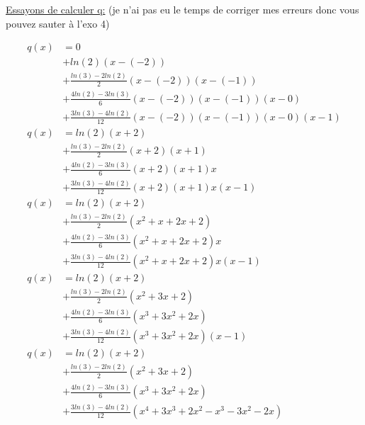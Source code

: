 \documentclass[12pt, letterpaper]{article}
\begin{document}
\begin{enumerate}
  \underline{Essayons de calculer q:} (je n'ai pas eu le temps de
  corriger mes erreurs donc vous pouvez sauter à l'exo 4)

  \begin{equation*}
    \begin{split}
      q(x) & = 0 \\
      & + ln(2) (x - (-2)) \\
      & + \frac{ln(3) - 2 ln(2)}{2} (x - (-2)) (x - (-1)) \\
      & + \frac{ 4 ln(2) - 3 ln(3)}{6} (x - (-2)) (x - (-1)) (x - 0) \\
      & + \frac{ 3 ln(3) - 4 ln(2)}{12}(x - (-2)) (x - (-1)) (x - 0) (x -
      1) \\
      q(x) & = ln(2) (x + 2) \\
      & + \frac{ln(3) - 2 ln(2)}{2} (x + 2) (x + 1) \\
      & + \frac{ 4 ln(2) - 3 ln(3)}{6} (x + 2) (x + 1) x \\
      & + \frac{ 3 ln(3) - 4 ln(2)}{12} (x + 2) (x + 1) x (x - 1) \\
      q(x) & = ln(2) (x + 2) \\
      & + \frac{ln(3) - 2 ln(2)}{2} (x^2 + x + 2x + 2) \\
      & + \frac{ 4 ln(2) - 3 ln(3)}{6} (x^2 + x + 2x + 2) x \\
      & + \frac{ 3 ln(3) - 4 ln(2)}{12} (x^2 + x + 2x + 2) x (x - 1) \\
      q(x) & = ln(2) (x + 2) \\
      & + \frac{ln(3) - 2 ln(2)}{2} (x^2 + 3x + 2) \\
      & + \frac{ 4 ln(2) - 3 ln(3)}{6} (x^3 + 3x^2 + 2x) \\
      & + \frac{ 3 ln(3) - 4 ln(2)}{12} (x^3 + 3x^2 + 2x) (x - 1) \\
      q(x) & = ln(2) (x + 2) \\
      & + \frac{ln(3) - 2 ln(2)}{2} (x^2 + 3x + 2) \\
      & + \frac{ 4 ln(2) - 3 ln(3)}{6} (x^3 + 3x^2 + 2x) \\
      & + \frac{ 3 ln(3) - 4 ln(2)}{12} (x^4 + 3x^3 + 2x^2 - x^3 - 3x^2 -
      2x)
    \end{split}
  \end{equation*}


\end{enumerate}
\end{document}
